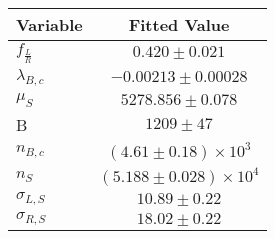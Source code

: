 \begin{tabular}[t]{lc}
\hline
Variable &Fitted Value\\
\hline\hline
$f_{\frac{L}{R}}$&$0.420\pm0.021$\\
\hline
$\lambda_{B,c}$&$-0.00213\pm0.00028$\\
\hline
$\mu_S$&$5278.856\pm0.078$\\
\hline
B&$1209\pm47$\\
\hline
$n_{B,c}$&$(4.61\pm0.18)\times 10^3$\\
\hline
$n_S$&$(5.188\pm0.028)\times 10^4$\\
\hline
$\sigma_{L, S}$&$10.89\pm0.22$\\
\hline
$\sigma_{R, S}$&$18.02\pm0.22$\\
\hline
\end{tabular}